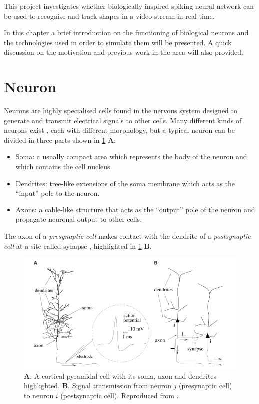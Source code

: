 This project investigates whether biologically inspired spiking neural network can be used to recognise and track shapes in a video stream in real time. 

In this chapter a brief introduction on the functioning of biological neurons and the technologies used in order to simulate them will be presented. A quick discussion on the motivation and previous work in the area will also provided. 

\section{Neuron}
Neurons are highly specialised cells found in the nervous system designed to generate and transmit electrical signals to other cells. Many different kinds of neurons exist \cite{Llinas:2008}, each with different morphology, but a typical neuron can be divided in three parts shown in \cref{fig:neuron_morphology} \textbf{A}:
\begin{itemize}
    \item Soma: a usually compact area which represents the body of the neuron and which contains the cell nucleus.
    \item Dendrites: tree-like extensions of the soma membrane which acts as the ``input'' pole to the neuron.
    \item Axons: a cable-like structure that acts as the ``output'' pole of the neuron and propagate neuronal output to other cells.
\end{itemize}
The axon of a \textit{presynaptic cell} makes contact with the dendrite of a \textit{postsynaptic cell} at a site called synapse \cite{Gerstner:2014}, highlighted in \cref{fig:neuron_morphology} \textbf{B}.

\begin{figure}[ht]
\centering
\includegraphics[scale=0.6]{images/neuron.png}
\caption[Neuron Morphology]{\textbf{A}. A cortical pyramidal cell with its soma, axon and dendrites highlighted. \textbf{B}. Signal transmission from neuron $j$ (presynaptic cell) to neuron $i$ (postsynaptic cell). Reproduced from \cite{Gerstner:2014}.}
\label{fig:neuron_morphology}
\end{figure}

